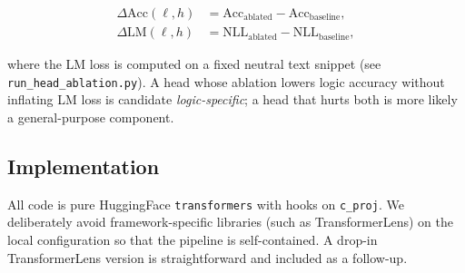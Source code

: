 \begin{align}
\Delta\mathrm{Acc}(\ell, h) &= \mathrm{Acc}_{\text{ablated}} - \mathrm{Acc}_{\text{baseline}},\\
\Delta\mathrm{LM}(\ell, h) &= \mathrm{NLL}_{\text{ablated}} - \mathrm{NLL}_{\text{baseline}},
\end{align}

where the LM loss is computed on a fixed neutral text snippet (see
\texttt{run\_head\_ablation.py}). A head whose ablation lowers logic
accuracy without inflating LM loss is candidate \emph{logic-specific};
a head that hurts both is more likely a general-purpose component.

\subsection{Implementation}
All code is pure HuggingFace \texttt{transformers} with hooks on
\texttt{c\_proj}. We deliberately avoid framework-specific libraries (such
as TransformerLens) on the local configuration so that the pipeline is
self-contained. A drop-in TransformerLens version is straightforward and
included as a follow-up.
